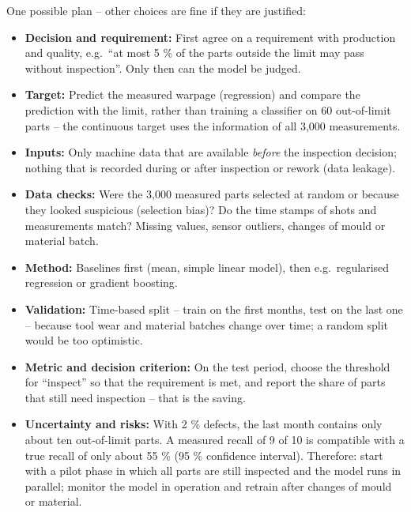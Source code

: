 \documentclass[
  letterpaper,
  DIV=11,
  numbers=noendperiod]{scrreprt}
\providecommand{\tightlist}{%
  \setlength{\itemsep}{0pt}\setlength{\parskip}{0pt}}\usepackage{longtable,booktabs,array}
\begin{document}
\begin{tcolorbox}[enhanced jigsaw, left=2mm, title=\textcolor{quarto-callout-caution-color}{\faFire}\hspace{0.5em}{Solution to Question 11}, opacityback=0, breakable, rightrule=.15mm, arc=.35mm, toptitle=1mm, colbacktitle=quarto-callout-caution-color!10!white, opacitybacktitle=0.6, coltitle=black, colframe=quarto-callout-caution-color-frame, bottomrule=.15mm, leftrule=.75mm, bottomtitle=1mm, titlerule=0mm, toprule=.15mm, colback=white]

One possible plan -- other choices are fine if they are justified:

\begin{itemize}
\tightlist
\item
  \textbf{Decision and requirement:} First agree on a requirement with
  production and quality, e.g.~``at most 5 \% of the parts outside the
  limit may pass without inspection''. Only then can the model be
  judged.
\item
  \textbf{Target:} Predict the measured warpage (regression) and compare
  the prediction with the limit, rather than training a classifier on 60
  out-of-limit parts -- the continuous target uses the information of
  all 3,000 measurements.
\item
  \textbf{Inputs:} Only machine data that are available \emph{before}
  the inspection decision; nothing that is recorded during or after
  inspection or rework (data leakage).
\item
  \textbf{Data checks:} Were the 3,000 measured parts selected at random
  or because they looked suspicious (selection bias)? Do the time stamps
  of shots and measurements match? Missing values, sensor outliers,
  changes of mould or material batch.
\item
  \textbf{Method:} Baselines first (mean, simple linear model), then
  e.g.~regularised regression or gradient boosting.
\item
  \textbf{Validation:} Time-based split -- train on the first months,
  test on the last one -- because tool wear and material batches change
  over time; a random split would be too optimistic.
\item
  \textbf{Metric and decision criterion:} On the test period, choose the
  threshold for ``inspect'' so that the requirement is met, and report
  the share of parts that still need inspection -- that is the saving.
\item
  \textbf{Uncertainty and risks:} With 2 \% defects, the last month
  contains only about ten out-of-limit parts. A measured recall of 9 of
  10 is compatible with a true recall of only about 55 \% (95 \%
  confidence interval). Therefore: start with a pilot phase in which all
  parts are still inspected and the model runs in parallel; monitor the
  model in operation and retrain after changes of mould or material.
\end{itemize}

\end{tcolorbox}
\end{document}
